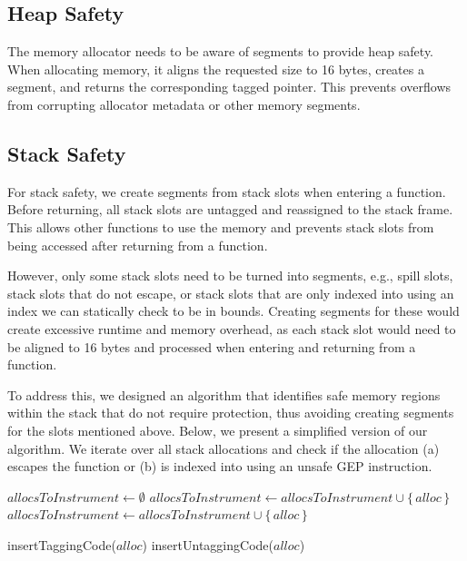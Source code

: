 \subsection{Heap Safety}
\label{subsec:heap-safety}

The memory allocator needs to be aware of segments to provide heap safety.
When allocating memory, it aligns the requested size to 16 bytes, creates a segment, and returns the corresponding tagged pointer.
This prevents overflows from corrupting allocator metadata or other memory segments.

\subsection{Stack Safety}
\label{subsec:stack-safety}

For stack safety, we create segments from stack slots when entering a function.
Before returning, all stack slots are untagged and reassigned to the stack frame.
This allows other functions to use the memory and prevents stack slots from being accessed after returning from a function.

However, only some stack slots need to be turned into segments, e.g., spill slots, stack slots that do not escape, or stack slots that are only indexed into using an index we can statically check to be in bounds.
Creating segments for these would create excessive runtime and memory overhead, as each stack slot would need to be aligned to 16 bytes and processed when entering and returning from a function.

To address this, we designed an algorithm that identifies safe memory regions within the stack that do not require protection, thus avoiding creating segments for the slots mentioned above.
Below, we present a simplified version of our algorithm.
We iterate over all stack allocations and check if the allocation (a) escapes the function or (b) is indexed into using an unsafe \ac{GEP} instruction.

\begin{algorithmic}
    \State $allocsToInstrument \gets \emptyset$
            \State $allocsToInstrument \gets allocsToInstrument \cup \{\,alloc\,\}$
        \State $allocsToInstrument \gets allocsToInstrument \cup \{\,alloc\,\}$
        \EndIf
    \EndFor

        \State insertTaggingCode($alloc$)
        \State insertUntaggingCode($alloc$)
    \EndFor
\end{algorithmic}

